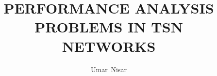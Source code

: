 \documentclass[journal,12pt,twocolumn]{IEEEtran}
\begin{document}
%


\title{PERFORMANCE ANALYSIS PROBLEMS IN TSN NETWORKS }%
%
%
%

\author{Umar~Nisar}%

% 
%
\end{document}
